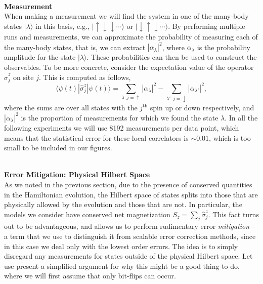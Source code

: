 \documentclass[twocolumn,showpacs,preprintnumbers,nofootinbib,amsmath,aps,pra,longbibliography,amssymb,superscriptaddress]{revtex4-1}
\newcommand{\la}{\langle}
\newcommand{\ra}{\rangle}
\begin{document}
\hfill\\\textbf{Measurement}\\
When making a measurement we will find the system in one of the many-body states $|\lambda\ra$ in this basis, e.g., $|\!\uparrow\downarrow \downarrow \cdots \ra$ or $|\!\downarrow \uparrow \downarrow \cdots \ra$. By performing multiple runs and measurements, we can approximate the probability of measuring each of the many-body states, that is, we can extract $|\alpha_\lambda|^2$, where $\alpha_\lambda$ is the probability amplitude for the state $|\lambda\ra$. These probabilities can then be used to construct the observables. To be more concrete, consider the expectation value of the operator $\hat{\sigma}^z_j$ on site $j$. This is computed as follows,
\begin{equation}
\la \psi(t) | \hat{\sigma}^z_j |\psi(t) \ra = \sum_{\lambda : j = \uparrow} |\alpha_\lambda|^2 - \sum_{\lambda' : j = \downarrow} |\alpha_{\lambda'}|^2,
\end{equation}
where the sums are over all states with the $j^\text{th}$ spin up or down respectively, and $|\alpha_\lambda|^2$ is the proportion of measurements for which we found the state $\lambda$. In all the following experiments we will use 8192 measurements per data point, which means that the statistical error for these local correlators is $\sim 0.01$, which is too small to be included in our figures.




\hfill\\\textbf{Error Mitigation: Physical Hilbert Space}\\
As we noted in the previous section, due to the presence of conserved quantities in the Hamiltonian evolution, the Hilbert space of states splits into those that are physically allowed by the evolution and those that are not. In particular, the models we consider have conserved net magnetization $S_z = \sum_j \hat{\sigma}_j^z$. This fact turns out to be advantageous, and allows us to perform rudimentary error \emph{mitigation} -- a term that we use to distinguish it from scalable error correction methods, since in this case we deal only with the lowest order errors.
The idea is to simply disregard any measurements for states outside of the physical Hilbert space. Let use present a simplified argument for why this might be a good thing to do, where we will first assume that only bit-flips can occur. 
\end{document}
